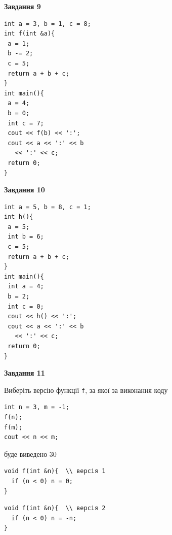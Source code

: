 \documentclass[12pt, ukrainian]{article}
\def\code#1{\Verb!#1!}
\begin{document}
{\begin {large}
\begin{minipage}[t]{11.0cm}
\end{minipage}


\begin{minipage}[t]{7.0cm}

\begin{center}
\textbf{Завдання 9}
\end{center}
\vspace{-8mm}

\begin{verbatim}
int a = 3, b = 1, c = 8;
int f(int &a){
 a = 1;
 b -= 2;
 c = 5;
 return a + b + c;
}
int main(){
 a = 4;
 b = 0;
 int c = 7;
 cout << f(b) << ':';
 cout << a << ':' << b 
   << ':' << c;
 return 0;
}
\end{verbatim}



\begin{center}
\textbf{Завдання 10}
\end{center}
\vspace{-8mm}

\begin{verbatim}
int a = 5, b = 8, c = 1;
int h(){
 a = 5;
 int b = 6;
 c = 5;
 return a + b + c;
}
int main(){
 int a = 4;
 b = 2;
 int c = 0;
 cout << h() << ':';
 cout << a << ':' << b 
   << ':' << c;
 return 0;
}
\end{verbatim}

\end{minipage}
\vline \hspace{1mm}
\begin{minipage}[t]{11.0cm}

\begin{center}
\textbf{Завдання 11}
\end{center}
Виберіть версію функції \code{f}, за якої за виконання коду
\begin{verbatim}
int n = 3, m = -1;
f(n);
f(m);
cout << n << m;
\end{verbatim}

буде виведено 30

\begin{verbatim}
void f(int &n){  \\ версія 1
  if (n < 0) n = 0;
}
\end{verbatim}

\vspace{-8mm}\begin{verbatim}
void f(int &n){  \\ версія 2
  if (n < 0) n = -n;
}
\end{verbatim}


\end{minipage}
\end{large}}
\end{document}
